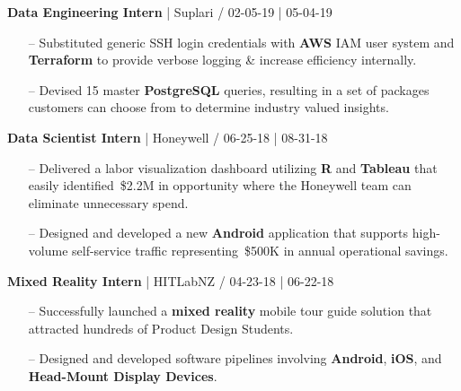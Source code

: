 \documentclass{article}
\begin{document}
\begin{multicols}{2}
{{}}
\hfill \break
{\footnotesize{\textbf{Data Engineering Intern} | Suplari / 02-05-19 | 05-04-19}}
{\footnotesize{
\begin{itemize}
	\item[--] Substituted generic SSH login credentials with \textbf{AWS} IAM user system and \textbf{Terraform} to provide verbose logging \& increase efficiency internally.
	\item[--] Devised 15 master \textbf{PostgreSQL} queries, resulting in a set of packages customers can choose from to determine industry valued insights.
\end{itemize} 
}}
\hfill \break
{\footnotesize{\textbf{Data Scientist Intern} | Honeywell / 06-25-18 | 08-31-18}}
{\footnotesize{
\begin{itemize}
	\item[--] Delivered a labor visualization dashboard utilizing \textbf{R} and \textbf{Tableau} that easily identified~\$2.2M in opportunity where the Honeywell team can eliminate unnecessary spend. 
	\item[--] Designed and developed a new \textbf{Android} application that supports high-volume self-service traffic representing~\$500K in annual operational savings.
\end{itemize}
}}
\hfill \break
{\footnotesize{\textbf{Mixed Reality Intern} | HITLabNZ / 04-23-18 | 06-22-18 }}
{\footnotesize{
\begin{itemize}
	\item[--] Successfully launched a \textbf{mixed reality} mobile tour guide solution that attracted hundreds of Product Design Students.
	\item[--] Designed and developed software pipelines involving \textbf{Android}, \textbf{iOS}, and \textbf{Head-Mount Display Devices}.

\end{itemize}}}
\end{multicols}
\end{document}
